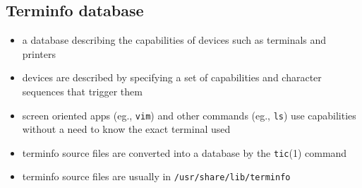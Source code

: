 \subsection{Terminfo database}

\begin{itemize}
\item a database describing the capabilities of devices such as terminals and
printers
\item devices are described by specifying a set of capabilities and character
sequences that trigger them
\item screen oriented apps (eg., \texttt{vim}) and other commands (eg.,
\texttt{ls}) use  capabilities without a need to know the exact
terminal used
\item terminfo source files are converted into a database by the \texttt{tic}(1)
command
\item terminfo source files are usually in \texttt{/usr/share/lib/terminfo}
\end{itemize}

